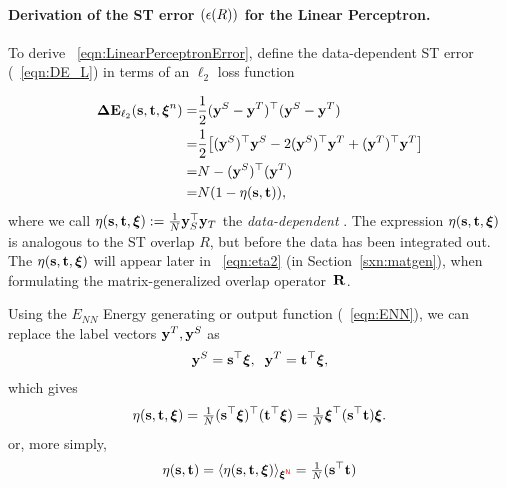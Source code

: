 \paragraph{Derivation of the  ST error $(\epsilon(R))$ for the Linear Perceptron.}
To derive \EQN~\ref{eqn:LinearPerceptronError},
define the data-dependent ST error (\EQN~\ref{eqn:DE_L}) in terms of an $\ell_2$ loss function

\begin{align}
\nonumber
\mathbf{\Delta {E}}_{\ell_2}({\mathbf{s}},{\mathbf{t}}, \boldsymbol{\xi}^{n})= & \frac{1}{2} (\mathbf{y}^{S} - \mathbf{y}^{T})^{\top} (\mathbf{y}^{S} - \mathbf{y}^{T}) \\
\nonumber
=& \frac{1}{2} \big[(\mathbf{y}^{S})^{\top} \mathbf{y}^{S} - 2 (\mathbf{y}^{S})^{\top} \mathbf{y}^{T} + (\mathbf{y}^{T})^{\top} \mathbf{y}^{T} \big] \\
\nonumber
=& N - (\mathbf{y}^{S})^{\top} (\mathbf{y}^{T}) \\
\label{eqn:deriveSTerror}
=& N(1 - \eta({\mathbf{s}},{\mathbf{t}})),
\end{align}
where we call $\eta({\mathbf{s}},{\mathbf{t}},\boldsymbol{\xi}):=\tfrac{1}{N}\mathbf{y}_{S}^{\top}\mathbf{y}_{T}$
the \emph{data-dependent \SelfOverlap}.
The expression $\eta({\mathbf{s}},{\mathbf{t}},\boldsymbol{\xi})$ is analogous to the ST overlap $R$, but before the data has been integrated out.
The \SelfOverlap $\eta({\mathbf{s}},{\mathbf{t}},\boldsymbol{\xi})$ will appear later in \EQN~\ref{eqn:eta2} (in Section~\ref{sxn:matgen}), 
when formulating the matrix-generalized overlap operator~$\mathbf{R}$.

Using the $E_{NN}$ Energy generating or output function (\EQN~\ref{eqn:ENN}), we can replace the label vectors $\mathbf{y}^{T},\mathbf{y}^{S}$ as
\begin{align}
\mathbf{y}^{S}={\mathbf{s}}^{\top}\boldsymbol{\xi},\;\;
\mathbf{y}^{T}={\mathbf{t}}^{\top}\boldsymbol{\xi}  ,
\end{align}
which gives
\begin{align}
  \label{eqn:eta_vec_xi_def}
\eta({\mathbf{s}},{\mathbf{t}},\boldsymbol{\xi}) = \tfrac{1}{N}({\mathbf{s}}^{\top}\boldsymbol{\xi})^{\top} ({\mathbf{t}}^{\top}\boldsymbol{\xi}) = \tfrac{1}{N}\boldsymbol{\xi}^{\top} ({\mathbf{s}}^{\top} {\mathbf{t}} )\boldsymbol{\xi}   .
\end{align}
or, more simply,
\begin{align}
  \label{eqn:eta_vec_avg_def}
\eta({\mathbf{s}},{\mathbf{t}}) = \langle\eta({\mathbf{s}},{\mathbf{t}},\boldsymbol{\xi})\rangle_{\boldsymbol{\xi}^{{\color{red}\sf{N}}}}=\tfrac{1}{N}({\mathbf{s}}^{\top} {\mathbf{t}} )
\end{align}

